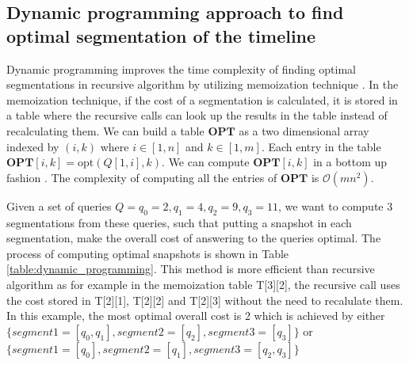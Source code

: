 		\subsection{Dynamic programming approach to find optimal segmentation of the timeline} \label{sec:dynamic_programming_optimal_segment}

			Dynamic programming improves the time complexity of finding optimal segmentations in recursive algorithm by utilizing memoization technique \cite{johnsonbaugh2003algorithms}. In the memoization technique, if the cost of a segmentation is calculated, it is stored in a table where the recursive calls can look up the results in the table instead of recalculating them. We can build a table $\mathbf{OPT}$ as a two dimensional array
			indexed by $(i, k)$ where $i\in [1, n]$ and $k\in [1, m]$.  Each entry
			in the table $\mathbf{OPT}[i,k] = \mathrm{opt}(Q[1,i], k)$.
			We can compute $\mathbf{OPT}[i,k]$ in a bottom up fashion \cite{kossmann2000iterative}.
			The complexity of computing all the entries of $\mathbf{OPT}$ is $\mathcal{O}(mn^2)$.

			\begin{example}
				Given a set of queries $Q={q_0=2,q_1=4,q_2=9,q_3=11}$, we want to compute 3 segmentations from these queries, such that putting a snapshot in each segmentation, make the overall cost of answering to the queries optimal. The process of computing optimal snapshots is  shown in Table \ref{table:dynamic_programming}. This method is more efficient than recursive algorithm as for example in the memoization table T[3][2], the recursive call uses the cost stored in T[2][1], T[2][2] and T[2][3] without the need to recalulate them. In this example, the most optimal overall cost is 2 which is achieved by either $\{segment1 =[q_0,q_1],segment2=[q_2],segment3=[q_3]\}$ or $\{segment1 =[q_0], segment2 = [q_1], segment3 = [q_2, q_3]\}$
			\label{example:dynamic_programming}
			\end{example}

